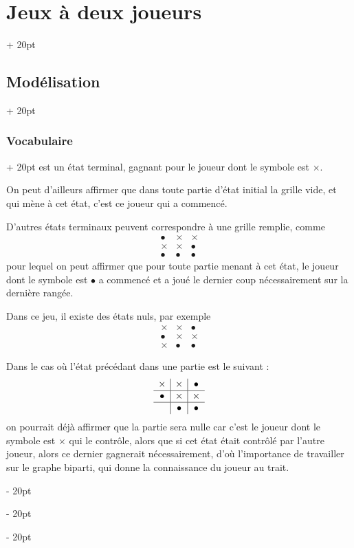 \documentclass[a4paper, 12pt, twoside]{article}
\newcommand{\ind}[1][20pt]{\advance\leftskip + #1}
\newcommand{\deind}[1][20pt]{\advance\leftskip - #1}
\newenvironment{indt}[2][20pt]{#2 \par \ind[#1]}{\par \deind} %
\begin{document}
\begin{indt}{\section{Jeux à deux joueurs}}
\begin{indt}{\subsection{Modélisation}}
\begin{indt}{\subsubsection{Vocabulaire}}
                est un état terminal, gagnant pour le joueur dont le symbole est $\times$.

                On peut d'ailleurs affirmer que dans toute partie d'état initial la grille vide, et qui mène à cet état, c'est ce joueur qui a commencé.

                D'autres états terminaux peuvent correspondre à une grille remplie, comme
                \[
                    \begin{array}{c|c|c}
                        \bullet & \times & \times
                        \\
                        \hline
                        \times & \times & \bullet
                        \\
                        \hline
                        \bullet & \bullet & \bullet
                    \end{array}
                \]
                pour lequel on peut affirmer que pour toute partie menant à cet état, le joueur dont le symbole est $\bullet$ a commencé et a joué le dernier coup nécessairement sur la dernière rangée.

                Dans ce jeu, il existe des états nuls, par exemple
                \[
                    \begin{array}{c|c|c}
                        \times & \times & \bullet
                        \\
                        \hline
                        \bullet & \times & \times
                        \\
                        \hline
                        \times & \bullet & \bullet
                    \end{array}
                \]

                Dans le cas où l'état précédant dans une partie est le suivant :
                \[
                    \begin{array}{c|c|c}
                        \times & \times & \bullet
                        \\
                        \hline
                        \bullet & \times & \times
                        \\
                        \hline
                        & \bullet & \bullet
                    \end{array}
                \]
                on pourrait déjà affirmer que la partie sera nulle car c'est le joueur dont le symbole est $\times$ qui le contrôle, alors que si cet état était contrôlé par l'autre joueur, alors ce dernier gagnerait nécessairement, d'où l'importance de travailler sur le graphe biparti, qui donne la connaissance du joueur au trait.


\end{indt}
\end{indt}
\end{indt}
\end{document}
